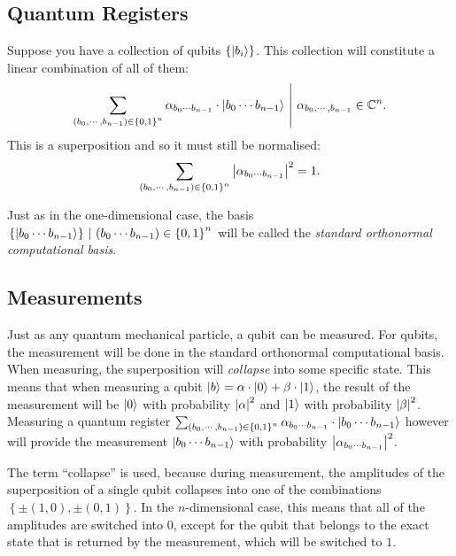 \subsection{Quantum Registers}
\label{subsec:quaReg}

Suppose you have a collection of qubits $\left\{ \lvert b_i\rangle \right\}$. This collection will constitute a linear combination of all of them:
\[
	\left.\sum\limits_{\left(b_0, \cdots, b_{n-1}\right) \in \left\{ 0,1 \right\}^n} \alpha_{b_0 \cdots b_{n-1}} \cdot \lvert b_0 \cdots b_{n-1}\rangle \ \middle\vert \ \alpha_{b_0, \cdots, b_{n-1}} \in \mathbb{C}^n.\right.
\]
This is a superposition and so it must still be normalised:
\[
	\sum\limits_{\left(b_0, \cdots, b_{n-1}\right) \in \left\{ 0,1 \right\}^n} \left\vert \alpha_{b_0 \cdots b_{n-1}} \right\vert^2 = 1.
\]

Just as in the one-dimensional case, the basis $\left.\left\{ \ket{b_0 \cdots b_{n-1}} \right\} \ \middle\vert \ \left(b_0 \cdots b_{n-1}\right) \in \left\{ 0,1 \right\}^n\right.$ will be called the \emph{standard orthonormal computational basis}.



\subsection{Measurements}
\label{subsec:measurements}

Just as any quantum mechanical particle, a qubit can be measured. For qubits, the measurement will be done in the standard orthonormal computational basis. When measuring, the superposition will \emph{collapse} into some specific state. This means that when measuring a qubit $\lvert b\rangle = \alpha \cdot \lvert0\rangle + \beta \cdot \lvert1\rangle$, the result of the measurement will be $\lvert0\rangle$ with probability $\left\vert \alpha \right\vert^2$ and $\lvert1\rangle$ with probability $\left\vert \beta \right\vert^2$. Measuring a quantum register $\sum_{\left(b_0, \cdots, b_{n-1}\right) \in \left\{ 0,1 \right\}^n} \alpha_{b_0 \cdots b_{n-1}} \cdot \lvert b_0 \cdots b_{n-1}\rangle$ however will provide the measurement $\lvert b_0 \cdots b_{n-1}\rangle$ with probability $\left\vert \alpha_{b_0 \cdots b_{n-1}} \right\vert^2$.

The term ``collapse'' is used, because during measurement, the amplitudes of the superposition of a single qubit collapses into one of the combinations $\left\{ \pm\left(1,0\right), \pm\left(0,1\right) \right\}$. In the $n$-dimensional case, this means that all of the amplitudes are switched into $0$, except for the qubit that belongs to the exact state that is returned by the measurement, which will be switched to $1$.

